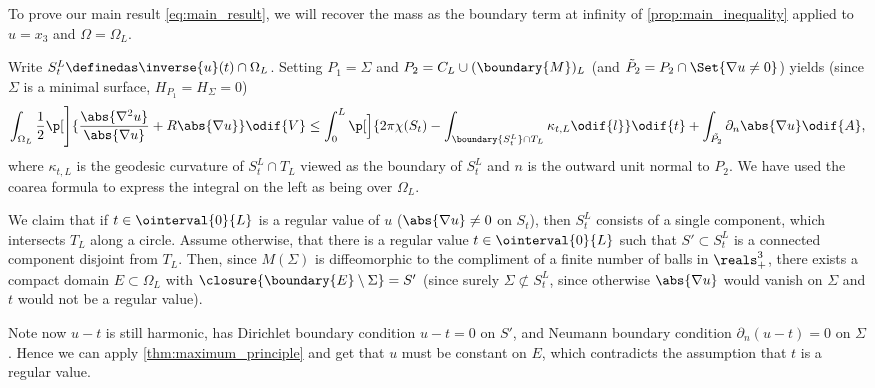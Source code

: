 \documentclass[titlepage,numbers=noenddot,oneside,%
cleardoublepage=empty,paper=a4,fontsize=11pt,%
english,%
]{scrartcl}
\begin{document}
\newcommand{\nonzeroboundary}{\partial_{\neq 0}M^L}\newcommand{\maxu}{\bar{u}}
\newcommand{\minu}{\underline{u}}
To prove our main result \cref{eq:main_result}, we will recover the mass as the boundary term at infinity of \cref{prop:main_inequality} applied to \( u=x_3 \) and \( \Omega=\Omega_L \).


Write \( S_t^L\definedas \inverse{u}(t)\cap \Omega_L \). Setting \( P_1=\Sigma\) and \( P_2=C_L\cup (\boundary{M})_L \) (and \( \tilde{P}_2=P_2\cap \Set{\nabla u\neq 0} \)) yields (since \( \Sigma \) is a minimal surface, \ie \( H_{P_1}=H_\Sigma=0 \))
\begin{equation}
    \int_{\Omega_L} \frac{1}{2}\p[\Bigg]{\frac{\abs{\nabla^2 u}}{\abs{\nabla u}}+R\abs{\nabla u} }\odif{V} \leq\int_{0}^{L}\p[\Big]{2\pi \chi(S_t)-\int _{\boundary{S_t^L} \cap T_L}\kappa_{t,L}\odif{l}}\odif{t}+ \int_{\tilde{P_2}}\partial_{n} \abs{\nabla u}\odif{A},\label{eq:just_insert_cylinder_into_main_inequality}
\end{equation}
where \( \kappa_{t,L} \) is the geodesic curvature of \( S_{t}^L \cap T_L\) viewed as the boundary of \( S_t^L \) and \( n \) is the outward unit normal to \( P_2 \). We have used the coarea formula to express the integral on the left as being over \( \Omega_L \).

We claim that if \( t\in \ointerval{0}{L} \) is a regular value of \( u \) (\ie \( \abs{\nabla u}\neq 0 \) on \( S_t \)), then \( S_t^L \) consists of a single component, which intersects \( T_L \) along a circle. Assume otherwise, \ie that there is a regular value \( t\in \ointerval{0}{L} \) such that \( S'\subset S_t^L \) is a connected component disjoint from \( T_L \). Then, since \( M(\Sigma) \) is diffeomorphic to the compliment of a finite number of balls in \( \reals^3_+ \), there exists a compact domain \( E\subset \Omega_L \) with \( \closure{\boundary{E}\setminus \Sigma}=S' \) (since surely \( \Sigma\not\subset S_t^L \), since otherwise \( \abs{\nabla u} \) would vanish on \( \Sigma \) and \( t \) would not be a regular value).

Note now \( u-t \) is still harmonic, has Dirichlet boundary condition \( u-t=0 \) on \( S' \), and Neumann boundary condition \( \partial_n (u-t)=0 \) on \( \Sigma \). Hence we can apply \cref{thm:maximum_principle} and get that \( u \) must be constant on \( E \), which contradicts the assumption that \( t \) is a regular value.
\end{document}
